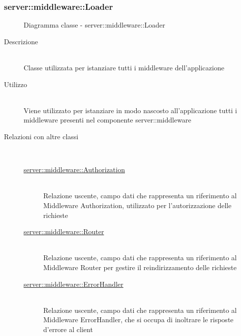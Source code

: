 \vspace{0.5cm}
\hypertarget{server::middleware::Loader}{}
\subsubsection[Loader]{server::middleware::Loader}
\begin{figure}[H]
	\centering
	\caption{Diagramma classe - server::middleware::Loader}
\end{figure}\begin{description}
\item[Descrizione] \hfill \\
Classe utilizzata per istanziare tutti i middleware dell'applicazione
\item[Utilizzo] \hfill \\
Viene utilizzato per istanziare in modo nascosto all'applicazione tutti i middleware presenti nel componente server::middleware
\item[Relazioni con altre classi] \hfill \\
\vspace{-7mm}
\begin{description}
	\item[\hyperlink{server::middleware::Authorization}{server::middleware::Authorization}] \hfill \\
	Relazione uscente, campo dati che rappresenta un riferimento al Middleware Authorization, utilizzato per l'autorizzazione delle richieste
	\item[\hyperlink{server::middleware::Router}{server::middleware::Router}] \hfill \\
	Relazione uscente, campo dati che rappresenta un riferimento al Middleware Router per gestire il reindirizzamento delle richieste
	\item[\hyperlink{server::middleware::ErrorHandler}{server::middleware::ErrorHandler}] \hfill \\
	Relazione uscente, campo dati che rappresenta un riferimento al Middleware ErrorHandler, che si occupa di inoltrare le risposte d'errore al client
\end{description}


\end{description}
